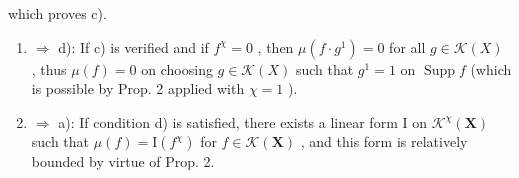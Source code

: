 which proves c).

\begin{enumerate}
\def\labelenumi{\alph{enumi})}
\setcounter{enumi}{2}
\item
  \(\Rightarrow\) d): If c) is verified and if \(f^{\chi} = 0\) , then \(\mu(f \cdot g^{1}) = 0\) for all \(g \in \mathcal{K}(X)\) , thus \(\mu(f) = 0\) on choosing \(g \in \mathcal{K}(X)\) such that \(g^{1} = 1\) on \(\operatorname{Supp} f\) (which is possible by Prop. 2 applied with \(\chi = 1\) ).
\item
  \(\Rightarrow\) a): If condition d) is satisfied, there exists a linear form I on \(\mathcal{K}^{\chi}(\mathbf{X})\) such that \(\mu(f) = \mathrm{I}(f^{\chi})\) for \(f \in \mathcal{K}(\mathbf{X})\) , and this form is relatively bounded by virtue of Prop. 2.
\end{enumerate}

